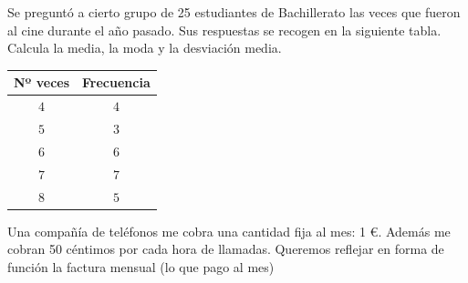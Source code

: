 \documentclass[addpoints,spanish, 12pt,a4paper]{exam}
\begin{document}
\begin{questions}
\question Se preguntó a cierto grupo de 25 estudiantes de Bachillerato las veces que fueron al cine durante el año pasado. Sus respuestas se recogen en la siguiente tabla. Calcula la media, la moda y la desviación media.
\begin{center}
\begin{tabular}{|c |c |}\hline
Nº veces & Frecuencia \\ 
\hline
$4$&$4$\\
\hline
$5$&$3$\\
\hline
$6$&$6$\\
\hline
$7$&$7$\\
\hline
$8$&$5$\\
\hline
\end{tabular}
\end{center}




\question Una compañía de teléfonos me cobra una cantidad fija al mes: 1 \euro . Además me cobran 50 céntimos por cada hora de llamadas. Queremos reflejar en forma de función la factura mensual (lo que pago al mes)
\begin{parts}

\end{parts}
\end{questions}
\end{document}
